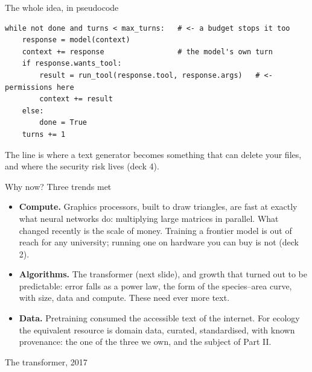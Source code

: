 \documentclass[11pt,aspectratio=169]{beamer}
\begin{document}
\begin{frame}[fragile]{The whole idea, in pseudocode}
\begin{lstlisting}
while not done and turns < max_turns:   # <- a budget stops it too
    response = model(context)
    context += response                 # the model's own turn
    if response.wants_tool:
        result = run_tool(response.tool, response.args)   # <- permissions here
        context += result
    else:
        done = True
    turns += 1
\end{lstlisting}
  \small
  The  line is where a text generator becomes something that
  can delete your files, and where the security risk lives (deck 4).
\end{frame}

\begin{frame}{Why now? Three trends met}
  \small
  \begin{itemize}
    \item \textbf{Compute.} Graphics processors, built to draw triangles, are
      fast at exactly what neural networks do: multiplying large matrices in
      parallel. What changed recently is the scale of money. Training a
      frontier model is out of reach for any university; running one on
      hardware you can buy is not (deck 2).
    \item \textbf{Algorithms.} The transformer (next slide), and growth that
      turned out to be predictable: error falls as a power law, the form of
      the species--area curve, with size, data and compute. These
       need ever more text.
    \item \textbf{Data.} Pretraining consumed the accessible text of the
      internet. For ecology the equivalent resource is domain data, curated,
      standardised, with known provenance: the one of the three we own, and
      the subject of Part II.
  \end{itemize}
\end{frame}

\begin{frame}{The transformer, 2017}
\end{frame}
\end{document}
